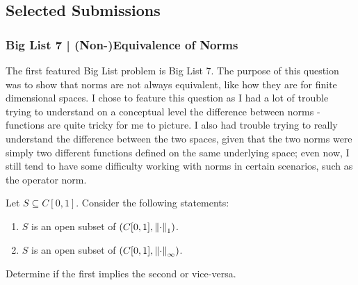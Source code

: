 \newpage

\subsection{Selected Submissions}
\subsubsection{Big List 7 | (Non-)Equivalence of Norms}

The first featured Big List problem is Big List 7. The purpose of this question
was to show that norms are not always equivalent, like how they are for finite
dimensional spaces. I chose to feature this question as I had a lot of trouble
trying to understand on a conceptual level the difference between norms -
functions are quite tricky for me to picture. I also had trouble trying to
really understand the difference between the two spaces, given that the two
norms were simply two different functions defined on the same underlying space;
even now, I still tend to have some difficulty working with norms in certain
scenarios, such as the operator norm.


\begin{qu}[num=7]
    Let $ S \subseteq C[0, 1] $. Consider the following statements:
    \begin{enumerate}
        \item $ S $ is an open subset of $ (C[0, 1], \left\|\cdot\right\|_{1}) $.
        \item $ S $ is an open subset of $ (C[0, 1], \left\|\cdot\right\|_{\infty}) $.
    \end{enumerate}
    Determine if the first implies the second or vice-versa.
\end{qu}

